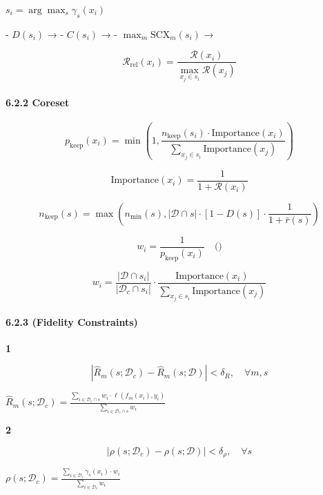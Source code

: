 \documentclass[
  12pt,
]{article}
\begin{document}
 \(s_i = \arg\max_s \gamma_s(x_i)\)

 - \textbf{ \(D(s_i)\)} →  -
\textbf{ \(C(s_i)\)} →  - \textbf{
\(\max_m \text{SCX}_m(s_i)\)} →


\textbf{}

\[
\mathcal{R}_{\text{rel}}(x_i) = \frac{\mathcal{R}(x_i)}{\max_{x_j \in s_i} \mathcal{R}(x_j)}
\]

\paragraph{6.2.2  Coreset
}\label{ux52a0ux6743-coreset-ux6784ux9020}

\textbf{}

\[
p_{\text{keep}}(x_i) = \min\left(1, \frac{n_{\text{keep}}(s_i) \cdot \text{Importance}(x_i)}{\sum_{x_j \in s_i} \text{Importance}(x_j)}\right)
\]



\[
\text{Importance}(x_i) = \frac{1}{1 + \mathcal{R}(x_i)}
\]

\[
n_{\text{keep}}(s) = \max\left(n_{\min}(s), |\mathcal{D} \cap s| \cdot [1 - D(s)] \cdot \frac{1}{1 + \bar{r}(s)}\right)
\]

\textbf{}

\[
w_i = \frac{1}{p_{\text{keep}}(x_i)} \quad \text{()}
\]



\[
w_i = \frac{|\mathcal{D} \cap s_i|}{|\mathcal{D}_c \cap s_i|} \cdot \frac{\text{Importance}(x_i)}{\sum_{x_j \in s_i} \text{Importance}(x_j)}
\]

\paragraph{6.2.3  (Fidelity
Constraints)}\label{ux4fddux771fux7ea6ux675f-fidelity-constraints}

\textbf{ 1}

\[
\left| \hat{R}_m(s; \mathcal{D}_c) - \hat{R}_m(s; \mathcal{D}) \right| < \delta_R, \quad \forall m,s
\]


\(\hat{R}_m(s; \mathcal{D}_c) = \frac{\sum_{i \in \mathcal{D}_c \cap s} w_i \cdot \ell(f_m(x_i), y_i)}{\sum_{i \in \mathcal{D}_c \cap s} w_i}\)

\textbf{ 2}

\[
\left| \rho(s; \mathcal{D}_c) - \rho(s; \mathcal{D}) \right| < \delta_\rho, \quad \forall s
\]


\(\rho(s; \mathcal{D}_c) = \frac{\sum_{i \in \mathcal{D}_c} \gamma_s(x_i) \cdot w_i}{\sum_{i \in \mathcal{D}_c} w_i}\)
\end{document}
